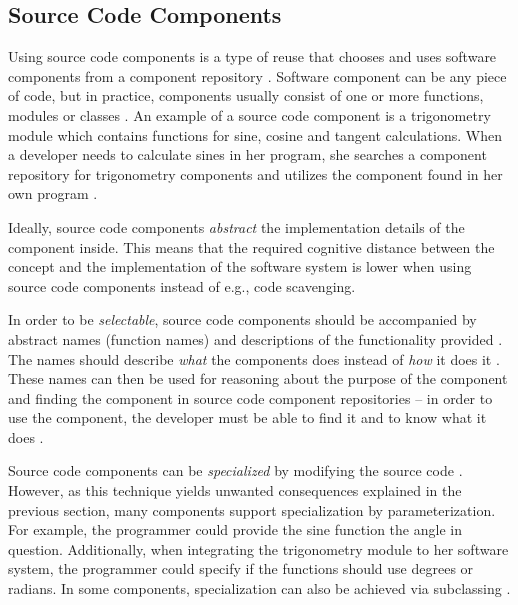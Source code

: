 \subsection{Source Code Components}

Using source code components is a type of reuse that chooses and uses software components from a component repository \citep[chap.~3]{sametinger_software_1997}. Software component can be any piece of code, but in practice, components usually consist of one or more functions, modules or classes \citep[chap.~3]{sametinger_software_1997}. An example of a source code component is a trigonometry module which contains functions for sine, cosine and tangent calculations. When a developer needs to calculate sines in her program, she searches a component repository for trigonometry components and utilizes the component found in her own program \citep[chap.~5]{krueger_software_1992}.

Ideally, source code components \emph{abstract} the implementation details of the component inside. This means that the required cognitive distance between the concept and the implementation of the software system is lower when using source code components instead of e.g., code scavenging. 

In order to be \emph{selectable}, source code components should be accompanied by abstract names (function names) and descriptions of the functionality provided \citep[chap.~5]{krueger_software_1992}. The names should describe \emph{what} the components does instead of \emph{how} it does it \citep[chap.~5]{krueger_software_1992}. These names can then be used for reasoning about the purpose of the component and finding the component in source code component repositories -- in order to use the component, the developer must be able to find it and to know what it does \citep[chap.~5]{krueger_software_1992}.

Source code components can be \emph{specialized} by modifying the source code \citet[chap.~5]{krueger_software_1992}. However, as this technique yields unwanted consequences explained in the previous section, many components support specialization by parameterization. For example, the programmer could provide the sine function the angle in question. Additionally, when integrating the trigonometry module to her software system, the programmer could specify if the functions should use degrees or radians. In some components, specialization can also be achieved via subclassing \citep[chap.~5]{krueger_software_1992}.

